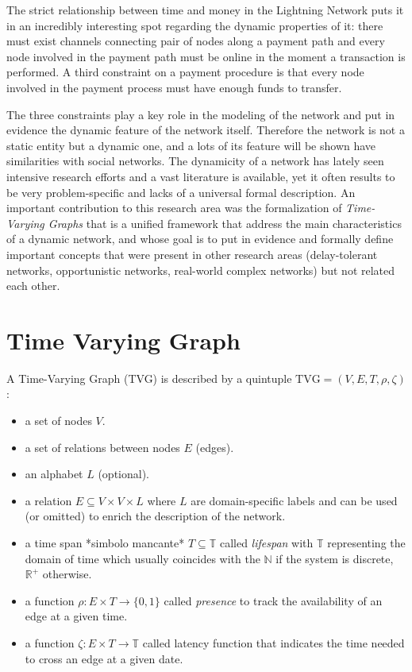 	The strict relationship between time and money in the Lightning Network puts it in an incredibly interesting spot regarding the dynamic properties of it: there must exist channels connecting pair of nodes along a payment path and every node involved in the payment path must be online in the moment a transaction is performed. A third constraint on a payment procedure is that every node involved in the payment process must have enough funds to transfer.
	
	The three constraints play a key role in the modeling of the network and put in evidence the dynamic feature of the network itself. Therefore the network is not a static entity but a dynamic one, and a lots of its feature will be shown have similarities with social networks. The dynamicity of a network has lately seen intensive research efforts and a vast literature is available, yet it often results to be very problem-specific and lacks of a universal formal description. An important contribution to this research area was the formalization of \textit{Time-Varying Graphs}\cite{Casteigts2012} that is a unified framework that address the main characteristics of a dynamic network, and whose goal is to put in evidence and formally define important concepts that were present in other research areas (delay-tolerant networks, opportunistic networks, real-world complex networks) but not related each other.
	
	
	\section{Time Varying Graph}

	A Time-Varying Graph (TVG) is described by a quintuple \(\text{TVG} = (V, E, T, \rho, \zeta) \):
	\begin{itemize}
		\item a set of nodes \(V\).
		
		\item a set of relations between nodes \(E\) (edges).	
		
		\item an alphabet \(L\) (optional).
		
		\item a relation \(E \subseteq V \times V \times L\) where \(L\) are domain-specific labels and can be used (or omitted) to enrich the description of the network.
		
		\item a time span *simbolo mancante* \( T \subseteq \mathbb{T}\) called \textit{lifespan} with \(\mathbb{T}\) representing the domain of time which usually coincides with the \(\mathbb{N}\) if the system is discrete, \(\mathbb{R}^+\) otherwise.
		
		\item a function \(\rho : E \times T \to \{0, 1\} \) called \textit{presence} to track the availability of an edge at a given time.
		
		\item a function \(\zeta : E \times T \to \mathbb{T}\) called latency function that indicates the time needed to cross an edge at a given date.
	\end{itemize}

